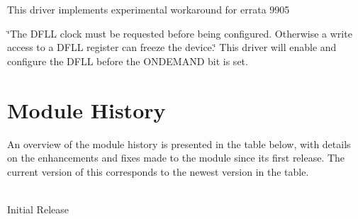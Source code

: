 \begin{DoxyItemize}
\item This driver implements experimental workaround for errata 9905

\char`\"{}\+The D\+F\+L\+L clock must be requested before being configured. Otherwise a
   write access to a D\+F\+L\+L register can freeze the device.\char`\"{} This driver will enable and configure the D\+F\+L\+L before the O\+N\+D\+E\+M\+A\+N\+D bit is set.
\end{DoxyItemize}\hypertarget{asfdoc_sam0_system_clock_extra_asfdoc_sam0_system_clock_extra_history}{}\section{Module History}\label{asfdoc_sam0_system_clock_extra_asfdoc_sam0_system_clock_extra_history}
An overview of the module history is presented in the table below, with details on the enhancements and fixes made to the module since its first release. The current version of this corresponds to the newest version in the table.

\begin{TabularC}{1}
\hline
{}\\
Initial Release  \\
\end{TabularC}
